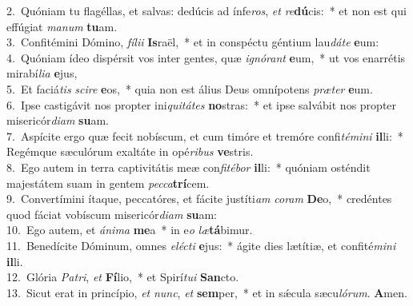 {2.~}Quóniam tu flagéllas, et salvas: dedúcis ad ínfe\textit{ros}, \textit{et} \textit{re}\textbf{dú}cis:~* et non est qui effúgiat \textit{ma}\textit{num} \textbf{tu}am.\\
{3.~}Confitémini Dómino, \textit{fí}\textit{li}\textit{i} \textbf{Is}raël,~* et in conspéctu géntium lau\textit{dá}\textit{te} \textbf{e}um:\\
{4.~}Quóniam ídeo dispérsit vos inter gentes, quæ \textit{i}\textit{gnó}\textit{rant} \textbf{e}um,~* ut vos enarrétis mirabí\textit{li}\textit{a} \textbf{e}jus,\\
{5.~}Et faciá\textit{tis} \textit{sci}\textit{re} \textbf{e}os,~* quia non est álius Deus omnípotens \textit{præ}\textit{ter} \textbf{e}um.\\
{6.~}Ipse castigávit nos propter ini\textit{qui}\textit{tá}\textit{tes} \textbf{no}stras:~* et ipse salvábit nos propter misericór\textit{di}\textit{am} \textbf{su}am.\\
{7.~}Aspícite ergo quæ fecit nobíscum, et cum timóre et tremóre confi\textit{té}\textit{mi}\textit{ni} \textbf{il}li:~* Regémque sæculórum exaltáte in opé\textit{ri}\textit{bus} \textbf{ve}stris.\\
{8.~}Ego autem in terra captivitátis meæ con\textit{fi}\textit{té}\textit{bor} \textbf{il}li:~* quóniam osténdit majestátem suam in gentem \textit{pec}\textit{ca}\textbf{trí}cem.\\
{9.~}Convertímini ítaque, peccatóres, et fácite justíti\textit{am} \textit{co}\textit{ram} \textbf{De}o,~* credéntes quod fáciat vobíscum misericór\textit{di}\textit{am} \textbf{su}am:\\
{10.~}Ego autem, et \textit{á}\textit{ni}\textit{ma} \textbf{me}a~* in e\textit{o} \textit{læ}\textbf{tá}bimur.\\
{11.~}Benedícite Dóminum, omnes \textit{e}\textit{lé}\textit{cti} \textbf{e}jus:~* ágite dies lætítiæ, et confité\textit{mi}\textit{ni} \textbf{il}li.\\
{12.~}Glória \textit{Pa}\textit{tri}, \textit{et} \textbf{Fí}lio,~* et Spirí\textit{tu}\textit{i} \textbf{San}cto.\\
{13.~}Sicut erat in princípio, \textit{et} \textit{nunc}, \textit{et} \textbf{sem}per,~* et in sǽcula sæcu\textit{ló}\textit{rum}. \textbf{A}men.\\
